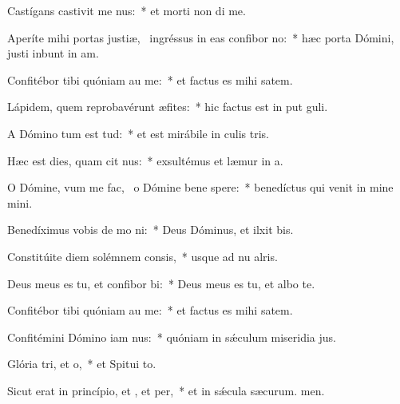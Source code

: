 \item Castígans castivit me nus:~* et morti non di me.
\item Aperíte mihi portas justiæ,~\pscross{} ingréssus in eas confibor no:~* hæc porta Dómini, justi inbunt in am.
\item Confitébor tibi quóniam au me:~* et factus es mihi  satem.
\item Lápidem, quem reprobavérunt æfites:~* hic factus est in put guli.
\item A Dómino tum est tud:~* et est mirábile in culis tris.
\item Hæc est dies, quam cit nus:~* exsultémus et læmur in a.
\item O Dómine, vum me fac,~\pscross{} o Dómine bene spere:~* benedíctus qui venit in mine mini.
\item Benedíximus vobis de mo ni:~* Deus Dóminus, et ilxit bis.
\item Constitúite diem solémnem  consis,~* usque ad nu alris.
\item Deus meus es tu, et confibor bi:~* Deus meus es tu, et albo te.
\item Confitébor tibi quóniam au me:~* et factus es mihi  satem.
\item Confitémini Dómino iam nus:~* quóniam in sǽculum miseridia jus.
\item Glória tri, et o,~* et Spitui to.
\item Sicut erat in princípio, et , et per,~* et in sǽcula sæcurum. men.
